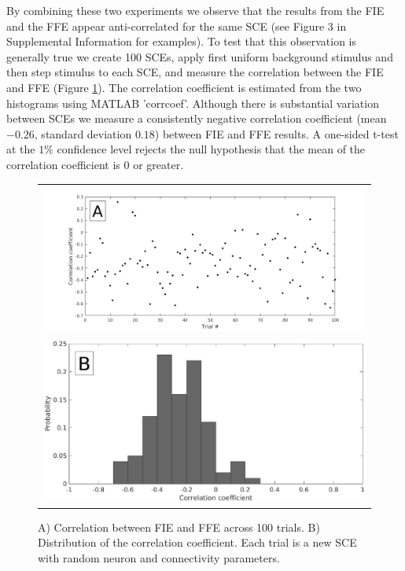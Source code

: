 \documentclass[12pt]{article}
\begin{document}
By combining these two experiments we observe that the results from the FIE and the FFE appear anti-correlated for the same SCE (see Figure 3 in Supplemental Information for examples).
To test that this observation is generally true we create 100 SCEs, apply first uniform background stimulus and then step stimulus to each SCE, and measure the correlation between the FIE and FFE (Figure \ref{fig:InitiationCorrelation}).
\color{red}The correlation coefficient is estimated from the two histograms using MATLAB 'corrcoef'.  \color{black}
Although there is substantial variation between SCEs we measure a consistently negative correlation coefficient (mean $-0.26$, standard deviation $0.18$) between FIE and FFE results.
\color{red}A one-sided t-test at the $1\%$ confidence level rejects the null hypothesis that the mean of the correlation coefficient is $0$ or greater\color{black}.
\begin{figure}[!htb]
 \centering
 \caption{\color{red} A) Correlation between FIE and FFE across 100 trials. B) Distribution of the correlation coefficient. Each trial is a new SCE with random neuron and connectivity parameters\color{black}. }
 \label{fig:InitiationCorrelation}
 \begin{tabular}{c}
     \includegraphics[width=\textwidth]{fig/InitiationCorrelation} \\ 
     \includegraphics[width=\textwidth]{fig/InitiationCorrelationPDF} 
 \end{tabular}
\end{figure}
\end{document}
